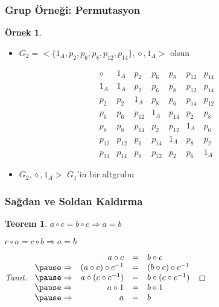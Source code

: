 \documentclass[dvipsnames]{beamer}
\theoremstyle{definition}
\theoremstyle{example}
\newtheorem{ornek}[theorem]{Örnek}
\theoremstyle{plain}
\newtheorem{teorem}[theorem]{Teorem}
\begin{document}
\begin{frame}
  \frametitle{Grup Örneği: Permutasyon}

  \begin{ornek}
    \begin{itemize}
      \item $G_2=<\{1_A,p_2,p_6,p_8,p_{12},p_{14}\},\diamond,1_A>$ olsun
    \end{itemize}
    \[
      \begin{array}{c||c|c|c|c|c|c}
        \diamond & 1_{A}  & p_{2}  & p_{6}  & p_{8}  & p_{12} & p_{14}\\\hline\hline
        1_{A}    & 1_{A}  & p_{2}  & p_{6}  & p_{8}  & p_{12} & p_{14}\\\hline
        p_{2}    & p_{2}  & 1_{A}  & p_{8}  & p_{6}  & p_{14} & p_{12}\\\hline
        p_{6}    & p_{6}  & p_{12} & 1_{A}  & p_{14} & p_{2}  & p_{8}\\\hline
        p_{8}    & p_{8}  & p_{14} & p_{2}  & p_{12} & 1_{A}  & p_{6}\\\hline
        p_{12}   & p_{12} & p_{6}  & p_{14} & 1_{A}  & p_{8}  & p_{2}\\\hline
        p_{14}   & p_{14} & p_{8}  & p_{12} & p_{2}  & p_{6}  & 1_{A}
      \end{array}
    \]

    \pause
    \bigskip
    \begin{itemize}
      \item $G_2,\diamond,1_A>$ $G_1$'in bir altgrubu
    \end{itemize}
  \end{ornek}
\end{frame}

\begin{frame}
  \frametitle{Sağdan ve Soldan Kaldırma}

  \begin{teorem}
    $a \circ c = b \circ c \Rightarrow a = b$

    $c \circ a = c \circ b \Rightarrow a = b$
  \end{teorem}

  \pause
  \begin{proof}[Tanıt]
    $\begin{array}{crcl}
                  & a \circ c                & = & b \circ c\\ \pause
      \Rightarrow & (a \circ c) \circ c^{-1} & = & (b \circ c) \circ c^{-1}\\ \pause
      \Rightarrow & a \circ (c \circ c^{-1}) & = & b \circ (c \circ c^{-1})\\ \pause
      \Rightarrow & a \circ 1                & = & b \circ 1\\ \pause
      \Rightarrow & a                        & = & b
    \end{array}$

  \end{proof}
\end{frame}
\end{document}
